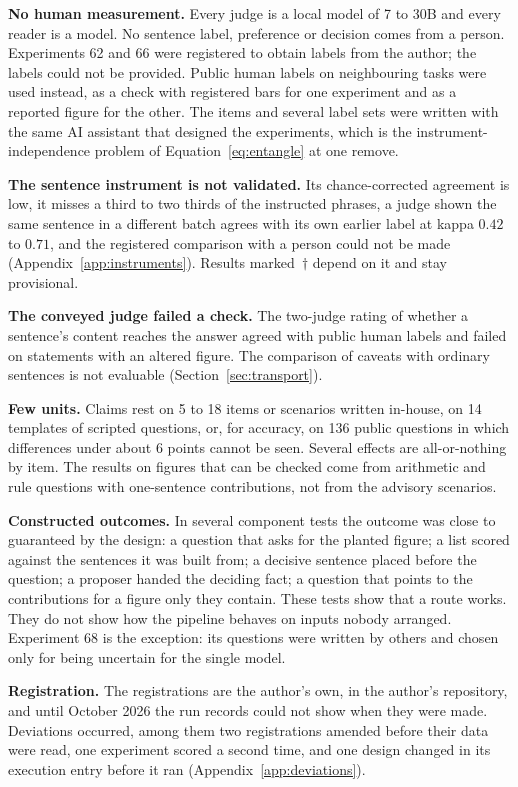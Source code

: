 \documentclass[10pt,twocolumn]{article}
\begin{document}
\textbf{No human measurement.} Every judge is a local model of 7 to
30B and every reader is a model. No sentence label, preference or
decision comes from a person. Experiments 62 and 66 were registered to
obtain labels from the author; the labels could not be provided.
Public human labels on neighbouring tasks were used instead, as a check
with registered bars for one experiment and as a reported figure for
the other. The items and several label sets were
written with the same AI assistant that designed the experiments, which
is the instrument-independence problem of Equation~\ref{eq:entangle} at
one remove.

\textbf{The sentence instrument is not validated.} Its chance-corrected
agreement is low, it misses a third to two thirds of the instructed
phrases, a judge shown the same sentence in a different batch agrees
with its own earlier label at kappa $0.42$ to $0.71$, and the
registered comparison with a person could not be made
(Appendix~\ref{app:instruments}). Results marked~$\dagger$ depend on it
and stay provisional.

\textbf{The conveyed judge failed a check.} The two-judge rating of
whether a sentence's content reaches the answer agreed with public
human labels and failed on statements with an altered figure. The
comparison of caveats with ordinary sentences is not evaluable
(Section~\ref{sec:transport}).

\textbf{Few units.} Claims rest on 5 to 18 items or scenarios written
in-house, on 14 templates of scripted questions, or, for accuracy, on
136 public questions in which differences under about 6 points cannot
be seen. Several effects are
all-or-nothing by item. The results on figures that can be checked come
from arithmetic and rule questions with one-sentence contributions, not
from the advisory scenarios.

\textbf{Constructed outcomes.} In several component tests the outcome
was close to guaranteed by the design: a question that asks for the
planted figure; a list scored against the sentences it was built from;
a decisive sentence placed before the question; a proposer handed the
deciding fact; a question that points to the contributions for a figure
only they contain. These tests show that a route works. They do not show
how the pipeline behaves on inputs nobody arranged. Experiment 68 is the
exception: its questions were written by others and chosen only for
being uncertain for the single model.

\textbf{Registration.} The registrations are the author's own, in the
author's repository, and until October 2026 the run records could not
show when they were made. Deviations occurred, among them two
registrations amended before their data were read, one experiment
scored a second time, and one design changed in its execution entry
before it ran (Appendix~\ref{app:deviations}).
\end{document}
